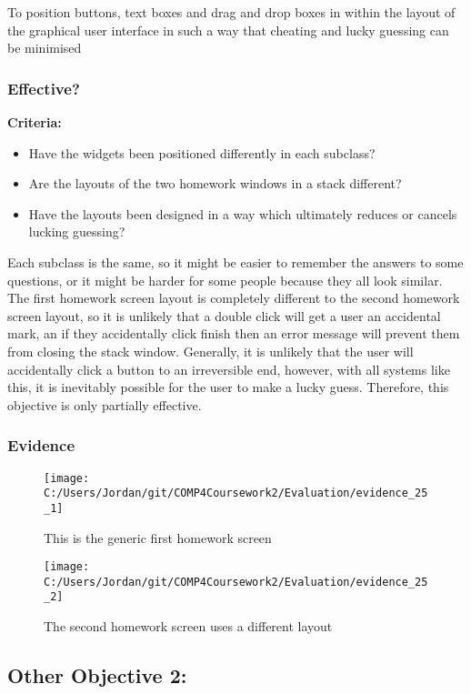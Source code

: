 To position buttons, text boxes and drag and drop boxes in within the layout of the graphical user interface in such a way that cheating and lucky guessing can be minimised

\subsubsection{Effective?}

\textbf{Criteria: }

\begin{itemize}
	\item Have the widgets been positioned differently in each subclass?
	\item Are the layouts of the two homework windows in a stack different?
	\item Have the layouts been designed in a way which ultimately reduces or cancels lucking guessing?
\end{itemize}

Each subclass is the same, so it might be easier to remember the answers to some questions, or it might be harder for some people because they all look similar. The first homework screen layout is completely different to the second homework screen layout, so it is unlikely that a double click will get a user an accidental mark, an if they accidentally click finish then an error message will prevent them from closing the stack window. Generally, it is unlikely that the user will accidentally click a button to an irreversible end, however, with all systems like this, it is inevitably possible for the user to make a lucky guess. Therefore, this objective is only partially effective.

\subsubsection{Evidence}

\begin{figure}[H]
	\texttt{[image: C:/Users/Jordan/git/COMP4Coursework2/Evaluation/evidence\_25\_1]}
	\caption{This is the generic first homework screen}
\end{figure}

\begin{figure}[H]
	\texttt{[image: C:/Users/Jordan/git/COMP4Coursework2/Evaluation/evidence\_25\_2]}
	\caption{The second homework screen uses a different layout}
\end{figure}

\subsection{Other Objective 2: }

